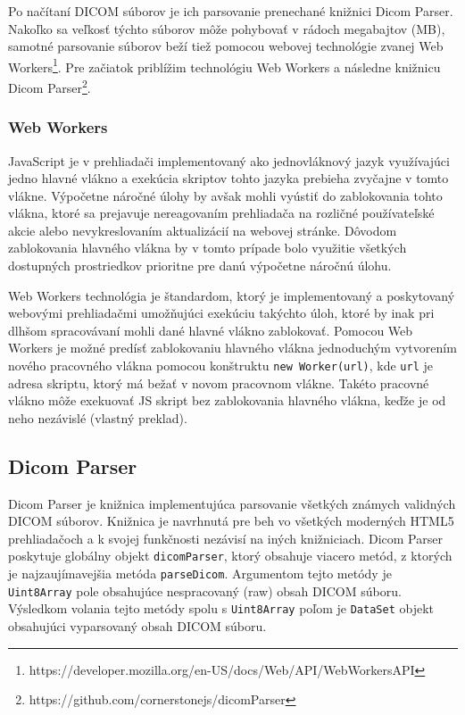 Po načítaní DICOM súborov je ich parsovanie prenechané knižnici Dicom Parser. Nakoľko sa veľkosť týchto súborov môže pohybovať v rádoch megabajtov (MB), samotné parsovanie súborov beží tiež pomocou webovej technológie zvanej Web Workers\footnote{https://developer.mozilla.org/en-US/docs/Web/API/Web\textunderscore Workers\textunderscore API}. Pre začiatok priblížim technológiu Web Workers a následne knižnicu Dicom Parser\footnote{https://github.com/cornerstonejs/dicomParser}.

\subsubsection {Web Workers}
JavaScript je v prehliadači implementovaný ako jednovláknový jazyk využívajúci jedno hlavné vlákno a exekúcia skriptov tohto jazyka prebieha zvyčajne v tomto vlákne. Výpočetne náročné úlohy by avšak mohli vyústiť do zablokovania tohto vlákna, ktoré sa prejavuje nereagovaním prehliadača na rozličné používateľské akcie alebo nevykreslovaním aktualizácií na webovej stránke. Dôvodom zablokovania hlavného vlákna by v tomto prípade bolo využitie všetkých dostupných prostriedkov prioritne pre danú výpočetne náročnú úlohu.

Web Workers technológia je štandardom, ktorý je implementovaný a poskytovaný webovými prehliadačmi umožňujúci exekúciu takýchto úloh, ktoré by inak pri dlhšom spracovávaní mohli dané hlavné vlákno zablokovať. Pomocou Web Workers je možné predísť zablokovaniu hlavného vlákna jednoduchým vytvorením nového pracovného vlákna pomocou konštruktu \texttt{new Worker(url)}, kde \texttt{url} je adresa skriptu, ktorý má bežať v novom pracovnom vlákne. Takéto pracovné vlákno môže exekuovať JS skript bez zablokovania hlavného vlákna, keďže je od neho nezávislé \cite{using_web_workers} (vlastný preklad).

\subsection {Dicom Parser}
Dicom Parser je knižnica implementujúca parsovanie všetkých známych validných DICOM súborov. Knižnica je navrhnutá pre beh vo všetkých moderných HTML5 prehliadačoch a k svojej funkčnosti nezávisí na iných knižniciach. Dicom Parser poskytuje globálny objekt \texttt{dicomParser}, ktorý obsahuje viacero metód, z ktorých je najzaujímavejšia metóda \texttt{parseDicom}. Argumentom tejto metódy je \texttt{Uint8Array} pole obsahujúce nespracovaný (raw) obsah DICOM súboru. Výsledkom volania tejto metódy spolu s \texttt{Uint8Array} poľom je \texttt{DataSet} objekt obsahujúci vyparsovaný obsah DICOM súboru.

